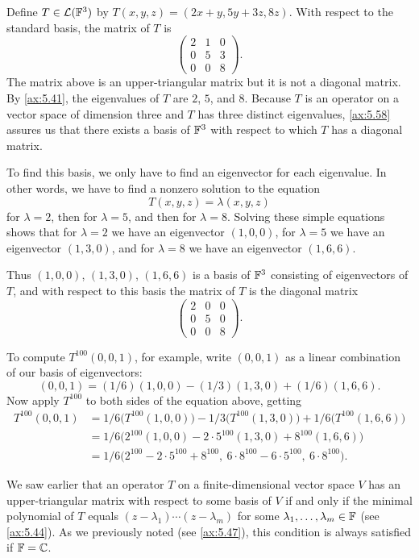 \begin{example}\label{ax:5.59}
Define $T\in\mathcal{L}(\mathbb{F}^3)$ by $T(x,y,z)=(2x+y,5y+3z,8z)$. With respect to the
standard basis, the matrix of $T$ is
\[ \begin{pmatrix} 2&1&0\\ 0&5&3\\ 0&0&8 \end{pmatrix}. \]
The matrix above is an upper-triangular matrix but it is not a diagonal matrix.
By \ref{ax:5.41}, the eigenvalues of $T$ are $2$, $5$, and $8$. Because $T$ is an
operator on a vector space of dimension three and $T$ has three distinct
eigenvalues, \ref{ax:5.58} assures us that there exists a basis of $\mathbb{F}^3$ with
respect to which $T$ has a diagonal matrix.

To find this basis, we only have to find an eigenvector for each eigenvalue. In
other words, we have to find a nonzero solution to the equation
\[ T(x,y,z)=\lambda(x,y,z) \]
for $\lambda=2$, then for $\lambda=5$, and then for $\lambda=8$. Solving these
simple equations shows that for $\lambda=2$ we have an eigenvector $(1,0,0)$, for
$\lambda=5$ we have an eigenvector $(1,3,0)$, and for $\lambda=8$ we have an
eigenvector $(1,6,6)$.

Thus $(1,0,0)$, $(1,3,0)$, $(1,6,6)$ is a basis of $\mathbb{F}^3$ consisting of
eigenvectors of $T$, and with respect to this basis the matrix of $T$ is the
diagonal matrix
\[ \begin{pmatrix} 2&0&0\\ 0&5&0\\ 0&0&8 \end{pmatrix}. \]

To compute $T^{100}(0,0,1)$, for example, write $(0,0,1)$ as a linear
combination of our basis of eigenvectors:
\[ (0,0,1)=(1/6)(1,0,0)-(1/3)(1,3,0)+(1/6)(1,6,6). \]
Now apply $T^{100}$ to both sides of the equation above, getting
\begin{align*}
T^{100}(0,0,1)
  &= 1/6\bigl(T^{100}(1,0,0)\bigr)-1/3\bigl(T^{100}(1,3,0)\bigr)
     +1/6\bigl(T^{100}(1,6,6)\bigr)\\
  &= 1/6\bigl(2^{100}(1,0,0)-2\cdot5^{100}(1,3,0)+8^{100}(1,6,6)\bigr)\\
  &= 1/6\bigl(2^{100}-2\cdot5^{100}+8^{100},\
     6\cdot8^{100}-6\cdot5^{100},\ 6\cdot8^{100}\bigr).
\end{align*}
\end{example}

We saw earlier that an operator $T$ on a finite-dimensional vector space $V$ has
an upper-triangular matrix with respect to some basis of $V$ if and only if the
minimal polynomial of $T$ equals $(z-\lambda_1)\cdots(z-\lambda_m)$ for some
$\lambda_1,\dots,\lambda_m\in\mathbb{F}$ (see \ref{ax:5.44}). As we previously noted
(see \ref{ax:5.47}), this condition is always satisfied if $\mathbb{F}=\mathbb{C}$.

